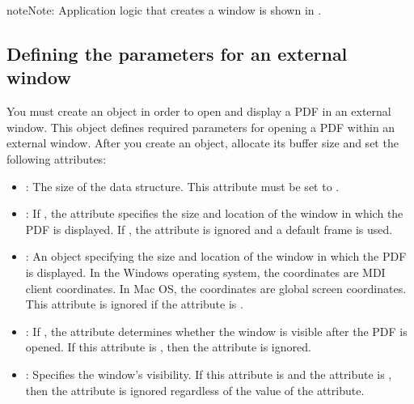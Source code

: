 \documentclass[letterpaper,12pt,english,openany,oneside]{sphinxmanual}
\begin{document}
\begin{sphinxadmonition}{note}{Note:}
Application logic that creates a window is shown in .
\end{sphinxadmonition}


\subsection{Defining the parameters for an external window}
\label{\detokenize{Plugins_Documents:defining-the-parameters-for-an-external-window}}
You must create an  object in order to open and display a PDF in an external window. This object defines required parameters for opening a PDF within an external window. After you create an  object, allocate its buffer size and set the following attributes:
\begin{itemize}
\item {} 
: The size of the data structure. This attribute must be set to .

\item {} 
: If , the  attribute specifies the size and location of the window in which the PDF is displayed. If , the  attribute is ignored and a default frame is used.

\item {} 
: An  object specifying the size and location of the window in which the PDF is displayed. In the Windows operating system, the coordinates are MDI client coordinates. In Mac OS, the coordinates are global screen coordinates. This attribute is ignored if the  attribute is .

\item {} 
: If , the  attribute determines whether the window is visible after the PDF is opened. If this attribute is , then the  attribute is ignored.

\item {} 
: Specifies the window’s visibility. If this attribute is  and the  attribute is , then the  attribute is ignored regardless of the value of the  attribute.

\end{itemize}
\end{document}

